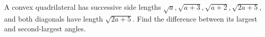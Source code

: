 A convex quadrilateral has successive side lengths $\sqrt a,\sqrt{a+3},\sqrt{a+2},\sqrt{2a+5}$, and both diagonals have length $\sqrt{2a+5}$. Find the difference between its largest and second-largest angles.
